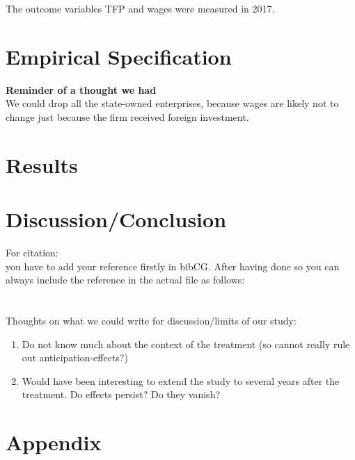\documentclass[a4paper,11pt]{scrartcl}
\newcommand{\sectionnumbering}[1]{%
  \setcounter{section}{0}%
   \renewcommand{\thesection}{\csname #1\endcsname{section}}}
\begin{document}
The outcome variables TFP and wages were measured in 2017. 


\section{Empirical Specification}

\textbf{Reminder of a thought we had}\\
We could drop all the state-owned enterprises, because wages are likely not to change just because the firm received foreign investment. 

\section{Results}



\section{Discussion/Conclusion}
For citation: \\
you have to add your reference firstly in bibCG. After having done so you can always include the reference in the actual file as follows: \\
 \citet{biddle1990sleep}\\
\citep[p.~35]{CaliendoHujerThomsen2008}	 \\


Thoughts on what we could write for discussion/limits of our study: 
\begin{enumerate}
\item Do not know much about the context of the treatment (so cannot really rule out anticipation-effects?)
\item Would have been interesting to extend the study to several years after the treatment. Do effects persist? Do they vanish? 
\end{enumerate}


\newpage





\section*{Appendix}
\sectionnumbering{Roman}
\setcounter{page}{3} %
\end{document}
